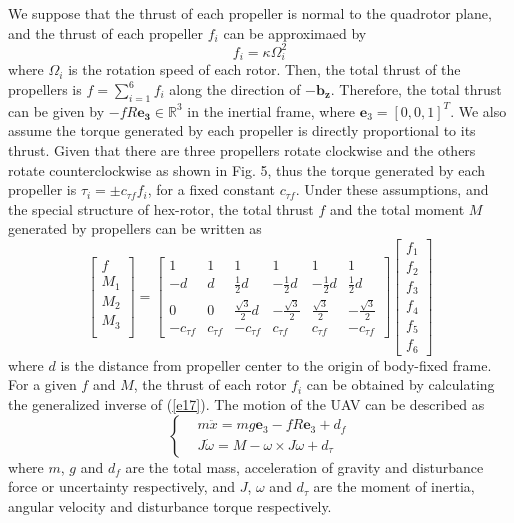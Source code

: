 \documentclass[letterpaper, 10 pt, conference]{ieeeconf}  %
\begin{document}
We suppose that the thrust of each propeller is normal to the quadrotor plane, and the thrust of each propeller $f_i$ can be approximaed by
\begin{equation}
    f_i = \kappa\Omega^2_i \label{e16}
\end{equation}
where $\Omega_i$ is the rotation speed of each rotor. 
Then, the total thrust of the propellers is $f=\sum_{i=1}^6f_i$ along the direction of $\bm{-b_z}$.
Therefore, the total thrust can be given by $-fR\bm{e_3}\in\mathbb{R}^3$ in the inertial frame, where $\bm{e}_3 = [0,0,1]^T$.
We also assume the torque generated by each propeller is directly proportional to its thrust.
Given that there are three propellers rotate clockwise and the others rotate counterclockwise as shown in Fig. 5, thus the torque generated by each propeller is $\tau_i=\pm c_{\tau f}f_i$, for a fixed constant $c_{\tau f}$.
Under these assumptions, and the special structure of hex-rotor, the total thrust $f$ and the total moment $M$ generated by propellers can be written as
\begin{equation}
    \begin{bmatrix}
        f \\ M_1 \\ M_2 \\ M_3 \\
    \end{bmatrix} = 
    \begin{bmatrix}
        1 & 1 & 1 & 1 & 1 & 1 \\
        -d & d & \frac 12 d & -\frac 12 d & -\frac 12 d & \frac 12 d \\
        0 & 0 & \frac{\sqrt3}{2} d & -\frac{\sqrt3}{2} & \frac{\sqrt3}{2} & -\frac{\sqrt3}{2} \\
        -c_{\tau f} & c_{\tau f} & -c_{\tau f} & c_{\tau f} & c_{\tau f} & -c_{\tau f}
    \end{bmatrix}
    \begin{bmatrix}
        f_1 \\ f_2 \\ f_3 \\ f_4 \\ f_5 \\ f_6
    \end{bmatrix}
    \label{e17}
\end{equation}
where $d$ is the distance from propeller center to the origin of body-fixed frame.
For a given $f$ and $M$, the thrust of each rotor $f_i$ can be obtained by calculating the generalized inverse of (\ref{e17}).
The motion of the UAV can be described as
\begin{equation}
    \left\{
        \begin{aligned}
            & m\ddot{x}=mg\bm{e}_3-fR\bm{e}_3+d_f \\
            & J\dot{\omega}=M-\omega\times J\omega + d_\tau
        \end{aligned}
    \right.
    \label{e18}
\end{equation}
where $m$, $g$ and $d_f$ are the total mass, acceleration of gravity and disturbance force or uncertainty respectively, and $J$, $\omega$ and $d_\tau$ are the moment of inertia, angular velocity and disturbance torque respectively.
\end{document}
